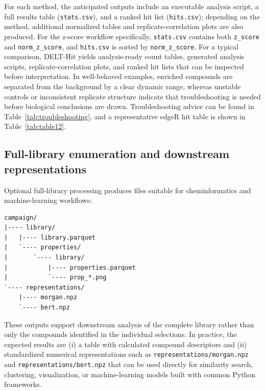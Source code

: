 For each method, the anticipated outputs include an executable analysis script, a full results table (\texttt{stats.csv}), and a ranked hit list (\texttt{hits.csv}); depending on the method, additional normalized tables and replicate-correlation plots are also produced. For the z-score workflow specifically, \texttt{stats.csv} contains both \texttt{z\_score} and \texttt{norm\_z\_score}, and \texttt{hits.csv} is sorted by \texttt{norm\_z\_score}. For a typical comparison, DELT-Hit yields analysis-ready count tables, generated analysis scripts, replicate-correlation plots, and ranked hit lists that can be inspected before interpretation. In well-behaved examples, enriched compounds are separated from the background by a clear dynamic range, whereas unstable controls or inconsistent replicate structure indicate that troubleshooting is needed before biological conclusions are drawn. Troubleshooting advice can be found in Table~\ref{tab:troubleshooting}, and a representative edgeR hit table is shown in Table~\ref{tab:table12}.

\subsection{Full-library enumeration and downstream representations}
Optional full-library processing produces files suitable for cheminformatics and machine-learning workflows:

\begin{lstlisting}
campaign/
|---- library/
|   |---- library.parquet
|   `---- properties/
|       `---- library/
|           |---- properties.parquet
|           `---- prop_*.png
`---- representations/
    |---- morgan.npz
    `---- bert.npz
\end{lstlisting}

These outputs support downstream analysis of the complete library rather than only the compounds identified in the individual selections. In practice, the expected results are (i) a table with calculated compound descriptors and (ii) standardized numerical representations such as \texttt{representations/morgan.npz} and \texttt{representations/bert.npz} that can be used directly for similarity search, clustering, visualization, or machine-learning models built with common Python frameworks.